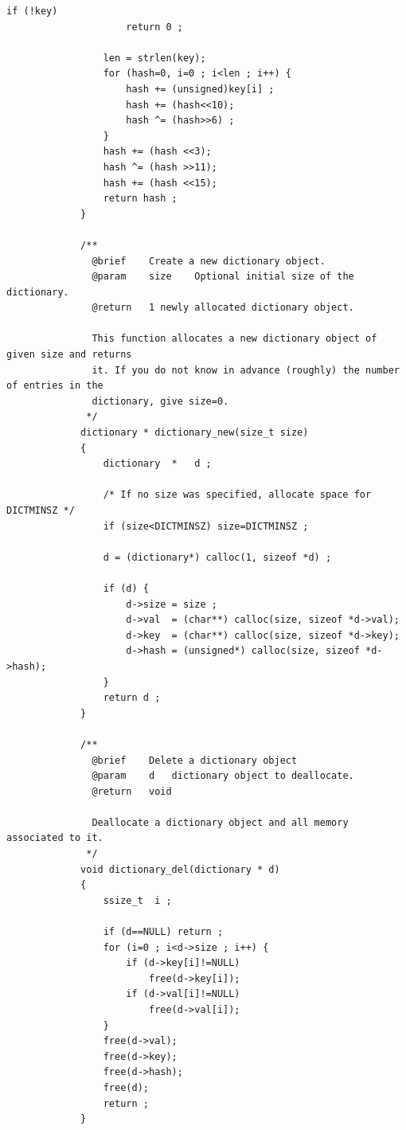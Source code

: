 \documentclass{article}
\begin{document}
\begin{Verbatim}[gobble=8]
                 if (!key)
                     return 0 ;
             
                 len = strlen(key);
                 for (hash=0, i=0 ; i<len ; i++) {
                     hash += (unsigned)key[i] ;
                     hash += (hash<<10);
                     hash ^= (hash>>6) ;
                 }
                 hash += (hash <<3);
                 hash ^= (hash >>11);
                 hash += (hash <<15);
                 return hash ;
             }
             
             /**
               @brief    Create a new dictionary object.
               @param    size    Optional initial size of the dictionary.
               @return   1 newly allocated dictionary object.
             
               This function allocates a new dictionary object of given size and returns
               it. If you do not know in advance (roughly) the number of entries in the
               dictionary, give size=0.
              */
             dictionary * dictionary_new(size_t size)
             {
                 dictionary  *   d ;
             
                 /* If no size was specified, allocate space for DICTMINSZ */
                 if (size<DICTMINSZ) size=DICTMINSZ ;
             
                 d = (dictionary*) calloc(1, sizeof *d) ;
             
                 if (d) {
                     d->size = size ;
                     d->val  = (char**) calloc(size, sizeof *d->val);
                     d->key  = (char**) calloc(size, sizeof *d->key);
                     d->hash = (unsigned*) calloc(size, sizeof *d->hash);
                 }
                 return d ;
             }
             
             /**
               @brief    Delete a dictionary object
               @param    d   dictionary object to deallocate.
               @return   void
             
               Deallocate a dictionary object and all memory associated to it.
              */
             void dictionary_del(dictionary * d)
             {
                 ssize_t  i ;
             
                 if (d==NULL) return ;
                 for (i=0 ; i<d->size ; i++) {
                     if (d->key[i]!=NULL)
                         free(d->key[i]);
                     if (d->val[i]!=NULL)
                         free(d->val[i]);
                 }
                 free(d->val);
                 free(d->key);
                 free(d->hash);
                 free(d);
                 return ;
             }
             

\end{Verbatim}
\end{document}
